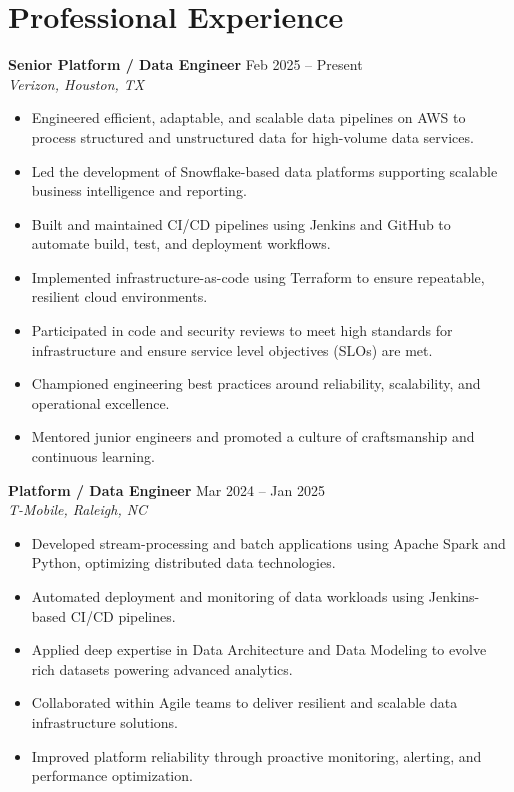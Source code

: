 \documentclass[10pt]{article}
\begin{document}
\section*{Professional Experience}

\textbf{Senior Platform / Data Engineer} \hfill Feb 2025 -- Present \\
\textit{Verizon, Houston, TX}
\begin{itemize}[leftmargin=*, itemsep=3pt]
    \item Engineered efficient, adaptable, and scalable data pipelines on AWS to process structured and unstructured data for high-volume data services.
    \item Led the development of Snowflake-based data platforms supporting scalable business intelligence and reporting.
    \item Built and maintained CI/CD pipelines using Jenkins and GitHub to automate build, test, and deployment workflows.
    \item Implemented infrastructure-as-code using Terraform to ensure repeatable, resilient cloud environments.
    \item Participated in code and security reviews to meet high standards for infrastructure and ensure service level objectives (SLOs) are met.
    \item Championed engineering best practices around reliability, scalability, and operational excellence.
    \item Mentored junior engineers and promoted a culture of craftsmanship and continuous learning.
\end{itemize}

\textbf{Platform / Data Engineer} \hfill Mar 2024 -- Jan 2025 \\
\textit{T-Mobile, Raleigh, NC}
\begin{itemize}[leftmargin=*, itemsep=3pt]
    \item Developed stream-processing and batch applications using Apache Spark and Python, optimizing distributed data technologies.
    \item Automated deployment and monitoring of data workloads using Jenkins-based CI/CD pipelines.
    \item Applied deep expertise in Data Architecture and Data Modeling to evolve rich datasets powering advanced analytics.
    \item Collaborated within Agile teams to deliver resilient and scalable data infrastructure solutions.
    \item Improved platform reliability through proactive monitoring, alerting, and performance optimization.
\end{itemize}
\end{document}
